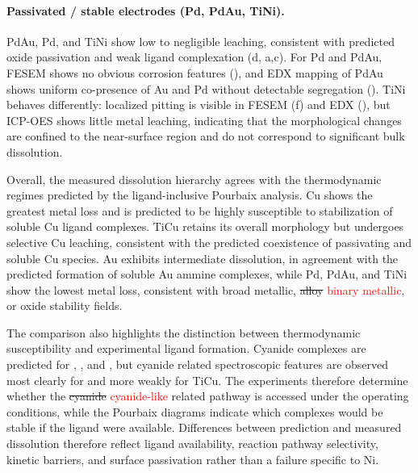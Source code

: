\documentclass[twoside,twocolumn,9pt]{article}
\begin{document}
\paragraph{Passivated / stable electrodes (Pd, PdAu, TiNi).}
PdAu, Pd, and TiNi show low to negligible leaching, consistent with predicted oxide passivation and weak ligand complexation (d, a,c).  For Pd and PdAu, FESEM shows no obvious corrosion features (), and EDX mapping of PdAu shows uniform co-presence of Au and Pd without detectable segregation (). TiNi behaves differently: localized pitting is visible in FESEM (f) and EDX (), but ICP-OES shows little metal leaching, indicating that the morphological changes are confined to the near-surface region and do not correspond to significant bulk dissolution.

Overall, the measured dissolution hierarchy agrees with the thermodynamic regimes predicted by the ligand-inclusive Pourbaix analysis. Cu shows the greatest metal loss and is predicted to be highly susceptible to stabilization of soluble Cu ligand complexes. TiCu retains its overall morphology but undergoes selective Cu leaching, consistent with the predicted coexistence of passivating  and soluble Cu species. Au exhibits intermediate dissolution, in agreement with the predicted formation of soluble Au ammine complexes, while Pd, PdAu, and TiNi show the lowest metal loss, consistent with broad metallic, \sout{alloy} \textcolor{red}{binary metallic}, or oxide stability fields.

The comparison also highlights the distinction between thermodynamic susceptibility and experimental ligand formation. Cyanide complexes are predicted for , , and , but cyanide related spectroscopic features are observed most clearly for  and more weakly for TiCu. The experiments therefore determine whether the \sout{cyanide} \textcolor{red}{cyanide-like} related pathway is accessed under the operating conditions, while the Pourbaix diagrams indicate which complexes would be stable if the ligand were available. Differences between prediction and measured dissolution therefore reflect ligand availability, reaction pathway selectivity, kinetic barriers, and surface passivation rather than a failure specific to Ni.
\end{document}

